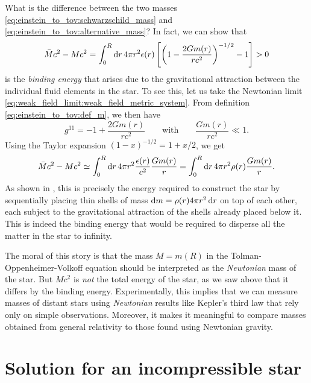 What is the difference between the two masses \eqref{eq:einstein_to_tov:schwarzschild_mass} and \eqref{eq:einstein_to_tov:alternative_mass}?
In fact, we can show that
\begin{equation}
	\bar{M} c^2 - M c^2 = \integral{4 \pi r^2 \epsilon(r) \left[ \left( 1-\frac{2Gm(r)}{rc^2} \right)^{-1/2} - 1 \right]}{r}{0}{R} > 0
\end{equation}
is the \emph{binding energy} that arises due to the gravitational attraction between the individual fluid elements in the star.
To see this, let us take the Newtonian limit \eqref{eq:weak_field_limit:weak_field_metric_system}.
From definition \eqref{eq:einstein_to_tov:def_m}, we then have
\begin{equation}
	g^{11} = -1 + \frac{2 G m(r)}{r c^2}
	\qquad \text{with} \qquad
	\frac{G m(r)}{rc^2} \ll 1 .
	\label{eq:weak_field_limit:small_gmr}
\end{equation}
Using the Taylor expansion $(1 - x)^{-1/2} = 1 + x/2$, we get
\begin{equation}
	\bar{M} c^2 - M c^2 \taylor \integral{4 \pi r^2 \frac{\epsilon(r)}{c^2} \frac{G m(r)}{r}}{r}{0}{R}
	                    =       \integral{4 \pi r^2 \rho(r) \frac{G m(r)}{r}}{r}{0}{R} .
\end{equation}
As shown in \cite[exercise 23.7]{ref:mtw}, this is precisely the energy required to construct the star by sequentially placing thin shells of mass $\dif m = \rho(r) 4 \pi r^2 \dif r$ on top of each other, each subject to the gravitational attraction of the shells already placed below it.
This is indeed the binding energy that would be required to disperse all the matter in the star to infinity.

The moral of this story is that the mass $M = m(R)$ in the Tolman-Oppenheimer-Volkoff equation should be interpreted as the \emph{Newtonian} mass of the star.
But $M c^2$ is \emph{not} the total energy of the star, as we saw above that it differs by the binding energy.
Experimentally, this implies that we can measure masses of distant stars using \emph{Newtonian} results like Kepler's third law that rely only on simple observations.
Moreover, it makes it meaningful to compare masses obtained from general relativity to those found using Newtonian gravity.
\section{Solution for an incompressible star}
\label{sec:incompressible_star}

